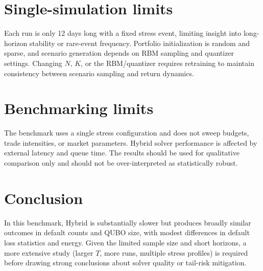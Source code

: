 \documentclass[11pt]{article}
\begin{document}
\section{Single-simulation limits}
Each run is only 12 days long with a fixed stress event, limiting insight into
long-horizon stability or rare-event frequency. Portfolio initialization is random
and sparse, and scenario generation depends on RBM sampling and quantizer settings.
Changing $N$, $K$, or the RBM/quantizer requires retraining to maintain consistency
between scenario sampling and return dynamics.

\section{Benchmarking limits}
The benchmark uses a single stress configuration and does not sweep budgets, trade
intensities, or market parameters. Hybrid solver performance is affected by external
latency and queue time. The results should be used for qualitative comparison
only and should not be over-interpreted as statistically robust.

\section{Conclusion}
In this benchmark, Hybrid is substantially slower but produces broadly similar
outcomes in default counts and QUBO size, with modest differences in default loss
statistics and energy. Given the limited sample size and short horizons, a more
extensive study (larger $T$, more runs, multiple stress profiles) is required
before drawing strong conclusions about solver quality or tail-risk mitigation.
\end{document}
